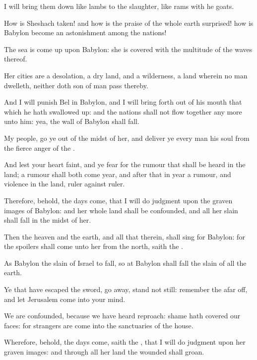{I will bring them
down like
lambs to the
slaughter, like
rams with he
goats.

How is
Sheshach
taken! and how is the
praise of the whole
earth
surprised! how is
Babylon become an
astonishment among the
nations!

The
sea is come
up upon
Babylon: she is
covered with the
multitude of the
waves thereof.

Her
cities are a
desolation, a
dry
land, and a
wilderness, a
land wherein no
man
dwelleth, neither doth
{}
son of
man
pass
thereby.

And I will
punish
Bel in
Babylon, and I will bring
forth out of his
mouth that which he hath swallowed
up: and the
nations shall not flow
together any more unto him: yea, the
wall of
Babylon shall
fall.

My
people, go ye
out of the
midst of her, and
deliver ye every
man his
soul from the
fierce
anger of the
{}.

And lest your
heart
faint, and ye
fear for the
rumour that shall be
heard in the
land; a
rumour shall both
come
{}
year, and
after that in
{}
year
{} a
rumour, and
violence in the
land,
ruler against
ruler.

Therefore, behold, the
days
come, that I will do
judgment upon the graven
images of
Babylon: and her whole
land shall be
confounded, and all her
slain shall
fall in the
midst of her.

Then the
heaven and the
earth, and all that
{} therein, shall
sing for
Babylon: for the
spoilers shall
come unto her from the
north,
saith the
{}.

As
Babylon
{} the
slain of
Israel to
fall, so at
Babylon shall
fall the
slain of all the
earth.

Ye that have
escaped the
sword, go
away, stand not
still:
remember the
{} afar
off, and let
Jerusalem
come into your
mind.

We are
confounded, because we have
heard
reproach:
shame hath
covered our
faces: for
strangers are
come into the
sanctuaries of the
{}
house.

Wherefore, behold, the
days
come,
saith the
{}, that I will do
judgment upon her graven
images: and through all her
land the
wounded shall
groan.

}
